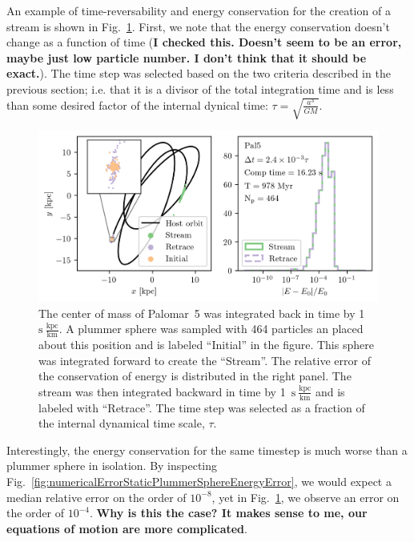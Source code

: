         An example of time-reversability and energy conservation for the creation of a stream is shown in Fig.~\ref{fig:NumericalErrorStreamRetrace_Pal5_Nsteps_32768_stepsPerTau_420}. First, we note that the energy conservation doesn't change as a function of time (\textbf{I checked this. Doesn't seem to be an error, maybe just low particle number. I don't think that it should be exact.}). The time step was selected based on the two criteria described in the previous section; i.e. that it is a divisor of the total integration time and is less than some desired factor of the internal dynical time: $\tau = \sqrt{\frac{a^3}{GM}}$.  
        \begin{figure}
            \centering
            \includegraphics[width=\linewidth]{images/NumericalErrorStreamRetrace_Pal5_Nsteps_32768_stepsPerTau_420.png}
            \caption{The center of mass of Palomar~5 was integrated back in time by 1~$\mathrm{s}~\frac{\mathrm{kpc}}{\mathrm{km}}$. A plummer sphere was sampled with 464 particles an placed about this position and is labeled ``Initial'' in the figure. This sphere was integrated forward to create the ``Stream''. The relative error of the conservation of energy is distributed in the right panel. The stream was then integrated backward in time by 1~$\mathrm{s}~\frac{\mathrm{kpc}}{\mathrm{km}}$ and is labeled with ``Retrace''. The time step was selected as a fraction of the internal dynamical time scale, $\tau$. }
            \label{fig:NumericalErrorStreamRetrace_Pal5_Nsteps_32768_stepsPerTau_420}
        \end{figure}
        Interestingly, the energy conservation for the same timestep is much worse than a plummer sphere in isolation. By inspecting Fig.~\ref{fig:numericalErrorStaticPlummerSphereEnergyError}, we would expect a median relative error on the order of $10^{-8}$, yet in Fig.~\ref{fig:NumericalErrorStreamRetrace_Pal5_Nsteps_32768_stepsPerTau_420}, we observe an error on the order of $10^{-4}$. \textbf{Why is this the case? It makes sense to me, our equations of motion are more complicated}.


